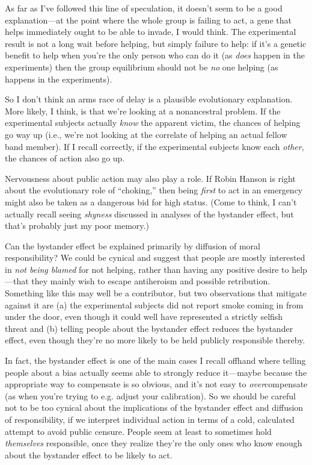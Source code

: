 {
 As far as I've followed this line of speculation,
it doesn't seem to be a good explanation---at the point
where the whole group is failing to act, a gene that helps immediately
ought to be able to invade, I would think. The experimental result is
not a long wait before helping, but simply failure to help: if
it's a genetic benefit to help when
you're the only person who can do it (as \textit{does}
happen in the experiments) then the group equilibrium should not be
\textit{no} one helping (as happens in the experiments).}

{
 So I don't think an arms race of delay is a
plausible evolutionary explanation. More likely, I think, is that
we're looking at a nonancestral problem. If the
experimental subjects actually \textit{know} the apparent victim, the
chances of helping go way up (i.e., we're not looking
at the correlate of helping an actual fellow band member). If I recall
correctly, if the experimental subjects know each \textit{other}, the
chances of action also go up.}

{
 Nervousness about public action may also play a role. If Robin
Hanson is right about the evolutionary role of
``choking,'' then being
\textit{first} to act in an emergency might also be taken as a
dangerous bid for high status. (Come to think, I can't
actually recall seeing \textit{shyness} discussed in analyses of the
bystander effect, but that's probably just my poor
memory.)}

{
 Can the bystander effect be explained primarily by diffusion of
moral responsibility? We could be cynical and suggest that people are
mostly interested in \textit{not being blamed} for not helping, rather
than having any positive desire to help---that they mainly wish to
escape antiheroism and possible retribution. Something like this may
well be a contributor, but two observations that mitigate against it
are (a) the experimental subjects did not report smoke coming in from
under the door, even though it could well have represented a strictly
selfish threat and (b) telling people about the bystander effect
reduces the bystander effect, even though they're no
more likely to be held publicly responsible thereby.}

{
 In fact, the bystander effect is one of the main cases I recall
offhand where telling people about a bias actually seems able to
strongly reduce it---maybe because the appropriate way to compensate is
so obvious, and it's not easy to
\textit{over}compensate (as when you're trying to e.g.
adjust your calibration). So we should be careful not to be too cynical
about the implications of the bystander effect and diffusion of
responsibility, if we interpret individual action in terms of a cold,
calculated attempt to avoid public censure. People seem at least to
sometimes hold \textit{themselves} responsible, once they realize
they're the only ones who know enough about the
bystander effect to be likely to act.}

